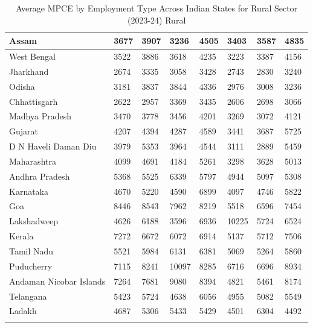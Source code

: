\documentclass{article}
\begin{document}
\begin{longtable}{|p{2cm}|p{1.9cm}|p{1.95cm}|p{2cm}|p{1.85cm}|p{2cm}|p{2cm}|p{1cm}|}
		Assam              & 3677  & 3907  & 3236  & 4505  & 3403  & 3587  & 4835  \\ \hline
		West Bengal        & 3522  & 3886  & 3618  & 4235  & 3223  & 3387  & 4156  \\ \hline
		Jharkhand          & 2674  & 3335  & 3058  & 3428  & 2743  & 2830  & 3240  \\ \hline
		Odisha             & 3181  & 3837  & 3844  & 4336  & 2976  & 3008  & 3236  \\ \hline
		Chhattisgarh       & 2622  & 2957  & 3369  & 3435  & 2606  & 2698  & 3066  \\ \hline
		Madhya Pradesh     & 3470  & 3778  & 3456  & 4201  & 3269  & 3072  & 4121  \\ \hline
		Gujarat            & 4207  & 4394  & 4287  & 4589  & 3441  & 3687  & 5725  \\ \hline
		D N Haveli Daman Diu & 3979  & 5353  & 3964  & 4544  & 3111  & 2889  & 5459  \\ \hline
		Maharashtra        & 4099  & 4691  & 4184  & 5261  & 3298  & 3628  & 5013  \\ \hline
		Andhra Pradesh     & 5368  & 5525  & 6339  & 5797  & 4944  & 5097  & 5308  \\ \hline
		Karnataka          & 4670  & 5220  & 4590  & 6899  & 4097  & 4746  & 5822  \\ \hline
		Goa                & 8446  & 8543  & 7962  & 8219  & 5518  & 6596  & 7454  \\ \hline
		Lakshadweep        & 4626  & 6188  & 3596  & 6936  & 10225 & 5724  & 6524  \\ \hline
		Kerala             & 7272  & 6672  & 6072  & 6914  & 5137  & 5712  & 7506  \\ \hline
		Tamil Nadu         & 5521  & 5984  & 6131  & 6381  & 5069  & 5264  & 5860  \\ \hline
		Puducherry         & 7115  & 8241  & 10097 & 8285  & 6716  & 6696  & 8934  \\ \hline
		Andaman Nicobar Islands & 7264  & 7681  & 9080  & 8394  & 4821  & 5461  & 8174  \\ \hline
		Telangana          & 5423  & 5724  & 4638  & 6056  & 4955  & 5082  & 5549  \\ \hline
		Ladakh             & 4687  & 5306  & 5433  & 5429  & 4501  & 6304  & 4492  \\ \hline
		\caption{Average MPCE by Employment Type Across Indian States for Rural Sector (2023-24) Rural}
		\label{table:mpce_employment}
	\end{longtable}
	
\end{document}
